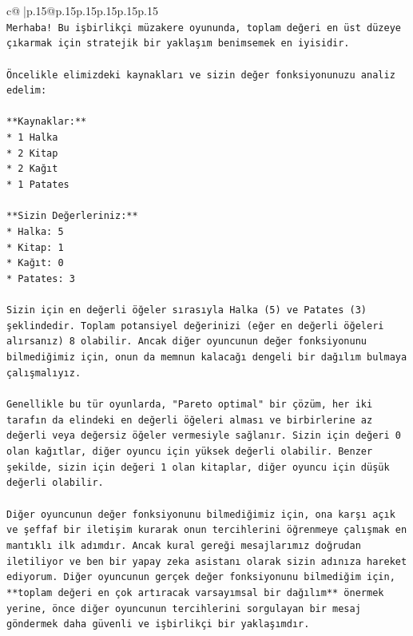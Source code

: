 \documentclass{article}
\begin{document}
{\begin{supertabular}{c@{$\;$}|p{.15\linewidth}@{}p{.15\linewidth}p{.15\linewidth}p{.15\linewidth}p{.15\linewidth}p{.15\linewidth}}
{{{\\ 
\texttt{Merhaba! Bu işbirlikçi müzakere oyununda, toplam değeri en üst düzeye çıkarmak için stratejik bir yaklaşım benimsemek en iyisidir.} \\
\\ 
\texttt{Öncelikle elimizdeki kaynakları ve sizin değer fonksiyonunuzu analiz edelim:} \\
\\ 
\texttt{**Kaynaklar:**} \\
\texttt{*   1 Halka} \\
\texttt{*   2 Kitap} \\
\texttt{*   2 Kağıt} \\
\texttt{*   1 Patates} \\
\\ 
\texttt{**Sizin Değerleriniz:**} \\
\texttt{*   Halka: 5} \\
\texttt{*   Kitap: 1} \\
\texttt{*   Kağıt: 0} \\
\texttt{*   Patates: 3} \\
\\ 
\texttt{Sizin için en değerli öğeler sırasıyla Halka (5) ve Patates (3) şeklindedir. Toplam potansiyel değerinizi (eğer en değerli öğeleri alırsanız) 8 olabilir. Ancak diğer oyuncunun değer fonksiyonunu bilmediğimiz için, onun da memnun kalacağı dengeli bir dağılım bulmaya çalışmalıyız.} \\
\\ 
\texttt{Genellikle bu tür oyunlarda, "Pareto optimal" bir çözüm, her iki tarafın da elindeki en değerli öğeleri alması ve birbirlerine az değerli veya değersiz öğeler vermesiyle sağlanır. Sizin için değeri 0 olan kağıtlar, diğer oyuncu için yüksek değerli olabilir. Benzer şekilde, sizin için değeri 1 olan kitaplar, diğer oyuncu için düşük değerli olabilir.} \\
\\ 
\texttt{Diğer oyuncunun değer fonksiyonunu bilmediğimiz için, ona karşı açık ve şeffaf bir iletişim kurarak onun tercihlerini öğrenmeye çalışmak en mantıklı ilk adımdır. Ancak kural gereği mesajlarımız doğrudan iletiliyor ve ben bir yapay zeka asistanı olarak sizin adınıza hareket ediyorum. Diğer oyuncunun gerçek değer fonksiyonunu bilmediğim için, **toplam değeri en çok artıracak varsayımsal bir dağılım** önermek yerine, önce diğer oyuncunun tercihlerini sorgulayan bir mesaj göndermek daha güvenli ve işbirlikçi bir yaklaşımdır.} \\
\\ 
}}}
\end{supertabular}}
\end{document}
